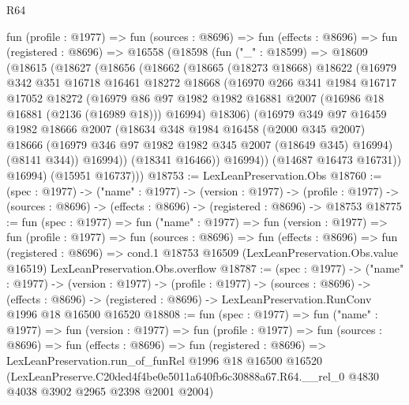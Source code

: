 \begin{lexlean}{R64}
\begin{coremodule}
  fun (profile : @1977) =>
  fun (sources : @8696) =>
  fun (effects : @8696) =>
  fun (registered : @8696) =>
  @16558
    (@18598
      (fun ("_" : @18599) =>
      @18609
        (@18615
          (@18627
            (@18656
              (@18662
                (@18665
                  (@18273 @18668)
                  @18622
                  (@16979
                    @342
                    @351
                    @16718
                    @16461
                    @18272
                    @18668
                    (@16970
                      @266
                      @341
                      @1984
                      @16717
                      @17052
                      @18272
                      (@16979
                        @86
                        @97
                        @1982
                        @1982
                        @16881
                        @2007
                        (@16986 @18 @16881 (@2136 (@16989 @18)))
                        @16994)
                      @18306)
                    (@16979
                      @349
                      @97
                      @16459
                      @1982
                      @18666
                      @2007
                      (@18634
                        @348
                        @1984
                        @16458
                        (@2000 @345 @2007)
                        @18666
                        (@16979 @346 @97 @1982 @1982 @345 @2007 (@18649 @345) @16994)
                        (@8141 @344))
                      @16994))
                  (@18341 @16466))
                @16994))
            (@14687 @16473 @16731))
          @16994)
        (@15951 @16737)))
@18753 := LexLeanPreservation.Obs
@18760 := (spec : @1977) ->
  ("name" : @1977) ->
  (version : @1977) ->
  (profile : @1977) -> (sources : @8696) -> (effects : @8696) -> (registered : @8696) -> @18753
@18775 := fun (spec : @1977) =>
  fun ("name" : @1977) =>
  fun (version : @1977) =>
  fun (profile : @1977) =>
  fun (sources : @8696) =>
  fun (effects : @8696) =>
  fun (registered : @8696) =>
  cond.{1} @18753 @16509 (LexLeanPreservation.Obs.value @16519) LexLeanPreservation.Obs.overflow
@18787 := (spec : @1977) ->
  ("name" : @1977) ->
  (version : @1977) ->
  (profile : @1977) ->
  (sources : @8696) ->
  (effects : @8696) -> (registered : @8696) -> LexLeanPreservation.RunConv @1996 @18 @16500 @16520
@18808 := fun (spec : @1977) =>
  fun ("name" : @1977) =>
  fun (version : @1977) =>
  fun (profile : @1977) =>
  fun (sources : @8696) =>
  fun (effects : @8696) =>
  fun (registered : @8696) =>
  LexLeanPreservation.run_of_funRel
    @1996
    @18
    @16500
    @16520
    (LexLeanPreserve.C20ded4f4be0e5011a640fb6c30888a67.R64.__rel_0
      @4830
      @4038
      @3902
      @2965
      @2398
      @2001
      @2004)
\end{coremodule}
\end{lexlean}
